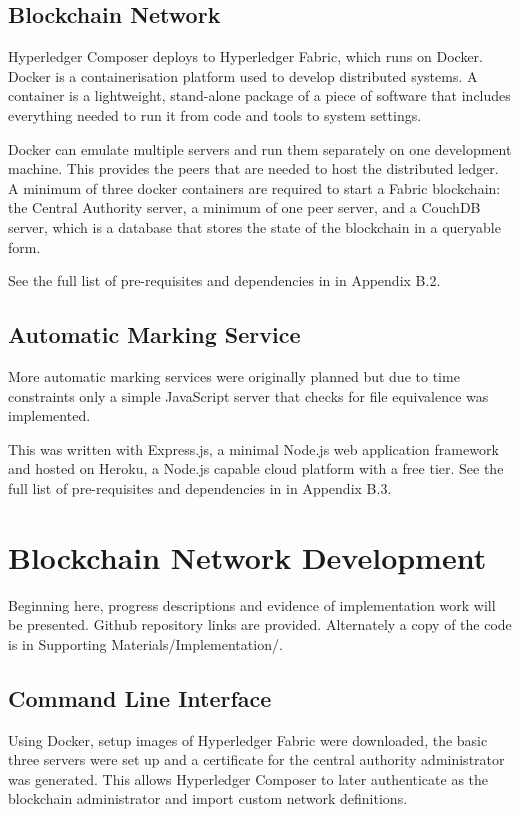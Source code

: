 \subsection{Blockchain Network}

Hyperledger Composer deploys to Hyperledger Fabric, which runs on Docker.
Docker is a containerisation platform used to develop distributed systems.
A container is a lightweight, stand-alone package of a piece of software that includes everything
needed to run it from code and tools to system settings.

Docker can emulate multiple servers and run them separately on one development machine.
This provides the peers that are needed to host the distributed ledger. 
A minimum of three docker containers are required to start a
Fabric blockchain: the Central Authority server, a minimum of one peer server, and a CouchDB server,
which is a database that stores the state of the blockchain in a queryable form.

See the full list of pre-requisites and dependencies in in Appendix B.2.

\subsection{Automatic Marking Service}

More automatic marking services were originally planned but due to time constraints only
a simple JavaScript server that checks for file equivalence was implemented.

This was written with Express.js, a minimal Node.js web application framework and hosted
on Heroku, a Node.js capable cloud platform with a free tier. See the full list of pre-requisites and dependencies in in Appendix B.3.

\section{Blockchain Network Development}

Beginning here, progress descriptions and evidence of implementation work will be presented. 
Github repository links are provided. Alternately a copy of the code is in Supporting Materials/Implementation/.

\subsection{Command Line Interface}
Using Docker, setup images of Hyperledger Fabric were downloaded, the basic three servers were set up
and a certificate for the central authority administrator was generated. This allows Hyperledger Composer
to later authenticate as the blockchain administrator and import custom network definitions.

